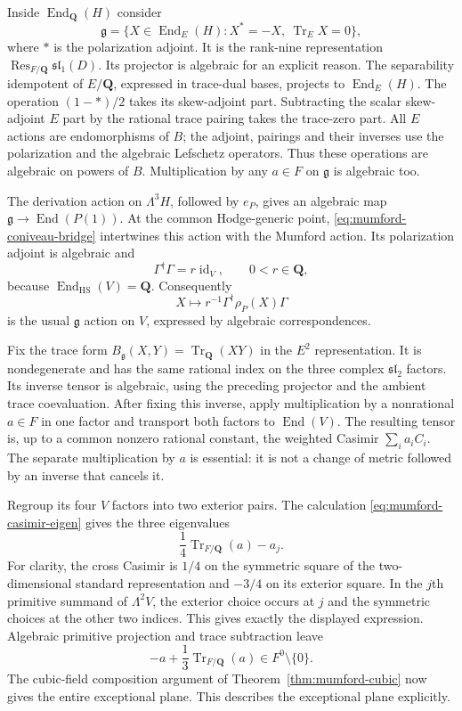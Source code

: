 Inside $\operatorname{End}_{\mathbf Q}(H)$ consider
\[
 \mathfrak g=\{X\in\operatorname{End}_E(H):
                    X^*=-X,\ \operatorname{Tr}_E X=0\},
\]
where $*$ is the polarization adjoint.  It is the rank-nine
representation $\operatorname{Res}_{F/\mathbf Q}\mathfrak{sl}_1(D)$.
Its projector is algebraic for an explicit reason.  The separability
idempotent of $E/\mathbf Q$, expressed in trace-dual bases, projects
to $\operatorname{End}_E(H)$.  The operation $(1-*)/2$ takes its
skew-adjoint part.  Subtracting the scalar skew-adjoint $E$ part by
the rational trace pairing takes the trace-zero part.
All $E$ actions are endomorphisms of $B$; the adjoint, pairings and
their inverses use the polarization and the algebraic Lefschetz
operators.  Thus these operations are algebraic on powers of $B$.
Multiplication by any $a\in F$ on $\mathfrak g$ is algebraic too.

The derivation action on $\Lambda^3H$, followed by $e_P$, gives an
algebraic map $\mathfrak g\to\operatorname{End}(P(1))$.
At the common Hodge-generic point, \eqref{eq:mumford-coniveau-bridge}
intertwines this action with the Mumford action.  Its polarization
adjoint is algebraic and
\[
 \Gamma^\dagger\Gamma=r\operatorname{id}_V,
 \qquad 0<r\in\mathbf Q,
\]
because $\operatorname{End}_{\mathrm{HS}}(V)=\mathbf Q$.
Consequently
\[
 X\longmapsto r^{-1}\Gamma^\dagger\rho_P(X)\Gamma
\]
is the usual $\mathfrak g$ action on $V$, expressed by algebraic
correspondences.

Fix the trace form $B_{\mathfrak g}(X,Y)=\operatorname{Tr}_{\mathbf Q}(XY)$
in the $E^2$ representation.  It is nondegenerate and has the same
rational index on the three complex $\mathfrak{sl}_2$ factors.
Its inverse tensor is algebraic, using the preceding projector and
the ambient trace coevaluation.  After fixing this inverse, apply
multiplication by a nonrational $a\in F$ in one factor and transport
both factors to $\operatorname{End}(V)$.  The resulting tensor is,
up to a common nonzero rational constant, the weighted Casimir
$\sum_i a_i C_i$.  The separate multiplication by $a$ is essential:
it is not a change of metric followed by an inverse that cancels it.

Regroup its four $V$ factors into two exterior pairs.  The calculation
\eqref{eq:mumford-casimir-eigen} gives the three eigenvalues
\[
 \frac14\operatorname{Tr}_{F/\mathbf Q}(a)-a_j.
\]
For clarity, the cross Casimir is $1/4$ on the symmetric square of
the two-dimensional standard representation and $-3/4$ on its
exterior square.  In the $j$th primitive summand of $\Lambda^2V$,
the exterior choice occurs at $j$ and the symmetric choices at the
other two indices.  This gives exactly the displayed expression.
Algebraic primitive projection and trace subtraction leave
\[
 -a+\frac13\operatorname{Tr}_{F/\mathbf Q}(a)\in F^0\setminus\{0\}.
\]
The cubic-field composition argument of
Theorem~\ref{thm:mumford-cubic} now gives the entire exceptional plane.
This describes the exceptional plane explicitly.

